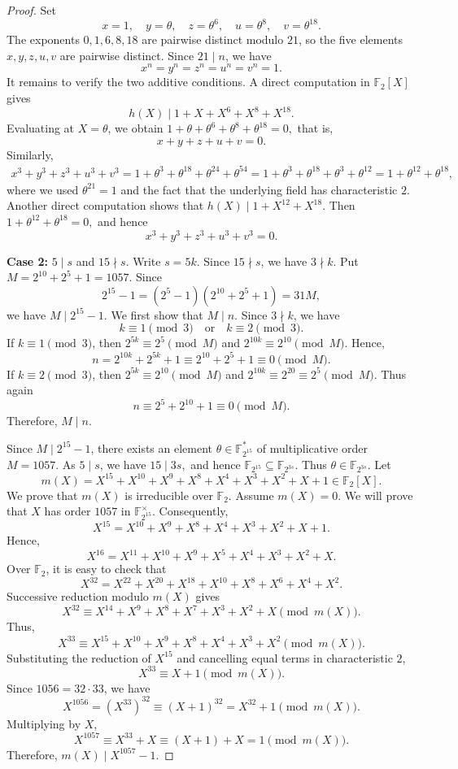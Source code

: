 \documentclass[10pt,a4paper]{amsart}
\begin{document}
\begin{proof}
Set
\[
x=1,\quad
y=\theta,\quad
z=\theta^6,\quad
u=\theta^8,\quad
v=\theta^{18}.
\]
The exponents \(0,1,6,8,18\) are pairwise distinct modulo \(21\), so the five elements \(x,y,z,u,v\) are pairwise distinct. Since \(21\mid n\), we have \[
x^n=y^n=z^n=u^n=v^n=1.
\]
It remains to verify the two additive conditions. A direct computation in \(\mathbb F_2[X]\) gives
\[
h(X)\mid 1+X+X^6+X^8+X^{18}.
\]
Evaluating at \(X=\theta\), we obtain
$
1+\theta+\theta^6+\theta^8+\theta^{18}=0,
$
that is,
\[
x+y+z+u+v=0.
\]
Similarly,
\[
\begin{aligned}
x^3+y^3+z^3+u^3+v^3
=1+\theta^3+\theta^{18}+\theta^{24}+\theta^{54}=1+\theta^3+\theta^{18}+\theta^3+\theta^{12}=1+\theta^{12}+\theta^{18},
\end{aligned}
\]
where we used \(\theta^{21}=1\) and the fact that the underlying field has characteristic \(2\). Another direct computation shows that
$
h(X)\mid 1+X^{12}+X^{18}.
$
Then
$
1+\theta^{12}+\theta^{18}=0,
$
and hence
\[
x^3+y^3+z^3+u^3+v^3=0.
\]

\noindent
\textbf{Case 2:} $5\mid s$ and $15\nmid s$. Write
$
s=5k.
$
Since \(15\nmid s\), we have \(3\nmid k\). Put
$
M=2^{10}+2^5+1=1057.
$
Since
\[
2^{15}-1=(2^5-1)(2^{10}+2^5+1)=31M,
\]
we have
$
M\mid 2^{15}-1.
$
We first show that \(M\mid n\). Since \(3\nmid k\), we have
\[
k\equiv 1 \pmod 3
\quad\text{or}\quad
k\equiv 2 \pmod 3.
\]
If \(k\equiv 1\pmod 3\), then
$
2^{5k}\equiv 2^5\pmod M
$
and
$
2^{10k}\equiv 2^{10}\pmod M.
$
Hence,
\[
n=2^{10k}+2^{5k}+1
\equiv 2^{10}+2^5+1
\equiv 0\pmod M.
\]
If \(k\equiv 2\pmod 3\), then
$
2^{5k}\equiv 2^{10}\pmod M
$
and
$
2^{10k}\equiv 2^{20}\equiv 2^5\pmod M.
$
Thus again
\[
n\equiv 2^5+2^{10}+1\equiv 0\pmod M.
\]
Therefore,
$
M\mid n.
$

Since \(M\mid 2^{15}-1\), there exists an element
$
\theta\in \mathbb F_{2^{15}}^{*}
$
of multiplicative order \(M=1057\). As \(5\mid s\), we have
$
15\mid 3s,
$
and hence
$
\mathbb F_{2^{15}}\subseteq \mathbb F_{2^{3s}}.
$
Thus \(\theta\in\mathbb F_{2^{3s}}\).
Let
\[
m(X)
=
X^{15}+X^{10}+X^9+X^8+X^4+X^3+X^2+X+1
\in\mathbb F_2[X].
\]
We prove that \(m(X)\) is irreducible over \(\mathbb F_2\).
Assume \(m(X)=0\). We will prove that \(X\) has order \(1057\) in \(\mathbb F_{2^{15}}^\times\). Consequently,
\[
X^{15}=X^{10}+X^9+X^8+X^4+X^3+X^2+X+1.
\]
Hence,
\[
X^{16}=X^{11}+X^{10}+X^9+X^5+X^4+X^3+X^2+X.
\]
Over \(\mathbb F_2\), it is easy to check that
\[
X^{32}=X^{22}+X^{20}+X^{18}+X^{10}+X^8+X^6+X^4+X^2.
\]
Successive reduction modulo \(m(X)\) gives
\[
X^{32}\equiv X^{14}+X^9+X^8+X^7+X^3+X^2+X\pmod {m(X)}.
\]
Thus,
\[
X^{33}\equiv X^{15}+X^{10}+X^9+X^8+X^4+X^3+X^2\pmod {m(X)}.
\]
Substituting the reduction of \(X^{15}\) and cancelling equal terms in characteristic \(2\),
\[
X^{33}\equiv X+1 \pmod {m(X)}.
\]
Since \(1056=32\cdot 33\), we have
\[
X^{1056}=(X^{33})^{32}\equiv (X+1)^{32}=X^{32}+1\pmod {m(X)}.
\]
Multiplying by \(X\),
\[
X^{1057}\equiv X^{33}+X\equiv (X+1)+X=1\pmod {m(X)}.
\]
Therefore,
$
m(X)\mid X^{1057}-1.
$


\end{proof}
\end{document}
